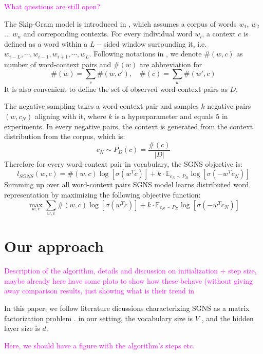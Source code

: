 \documentclass[letterpaper]{article} %
\begin{document}
\textcolor{magenta}{What questions are still open?}

The Skip-Gram model is introduced in \cite{NIPS2013_5021}, which assumes a corpus of words $w_1$, $w_2$ ... $w_n$ and correponding contexts. For every individual word $w_i$, a context $c$ is defined as a word within a $L-$sided window surrounding it, i.e. $w_{i−L},\cdots, w_{i−1},w_{i+1},\cdots,w_L$. Following notations in \cite{levy2014neural}, we denote $\#(w,c)$ as number of word-context pairs and $\#(w)$ are abbreviation for
\begin{equation}
\#(w)=\sum_c\#(w,c'),\quad\#(c)=\sum_w\#(w',c)	
\end{equation}
It is also convenient to define the set of observed word-context pairs as $D$. 


The negative sampling takes a word-context pair and samples $k$ negative pairs $(w,c_N)$ aligning with it, where $k$ is a hyperparameter and equals $5$ in experiments. In every negative pairs, the context is generated from the context distribution from the corpus, which is:
\begin{equation}
	c_N\sim P_D(c)=\frac{\#(c)}{|D|}
\end{equation}
Therefore for every word-context pair in vocabulary, the SGNS objective is:
\begin{equation}
	l_{SGNS}(w,c)= \#(w,c)\log[\sigma(w^Tc)]+k\cdot\mathbb{E}_{c_N\sim P_D}\log[\sigma(-w^Tc_N)]
\end{equation}
Summing up over all word-context pairs SGNS model learns distributed word representation by maximizing the following objective function:
\begin{equation}
	\max_{w,c} \sum_{w,c}\#(w,c)\log[\sigma(w^Tc)]+k\cdot\mathbb{E}_{c_N\sim P_D}\log[\sigma(-w^Tc_N)]
\end{equation}
\section{Our approach}
\textcolor{magenta}{Description of the algorithm, details and discussion on initialization + step size, maybe already here have some plots to show how these behave (without giving away comparison results, just showing what is their trend in}

In this paper, we follow literature dicussions characterizing SGNS as a matrix factorization problem \cite{levy2014neural}\cite{levy2015improving}. in our setting, the vocabulary size is $V$ , and the hidden layer size is $d$. 


\textcolor{magenta}{Here, we should have a figure with the algorithm's steps etc.}
\end{document}
